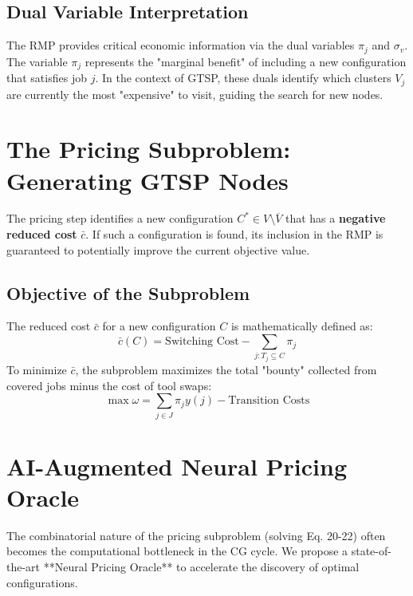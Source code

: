 \documentclass[12pt]{article}
\begin{document}
\subsection{Dual Variable Interpretation}
The RMP provides critical economic information via the dual variables $\pi_j$ and $\sigma_v$. The variable $\pi_j$ represents the "marginal benefit" of including a new configuration that satisfies job $j$. In the context of GTSP, these duals identify which clusters $V_j$ are currently the most "expensive" to visit, guiding the search for new nodes.

\section{The Pricing Subproblem: Generating GTSP Nodes}

The pricing step identifies a new configuration $C^* \in V \setminus \overline{V}$ that has a \textbf{negative reduced cost} $\bar{c}$. If such a configuration is found, its inclusion in the RMP is guaranteed to potentially improve the current objective value.

\subsection{Objective of the Subproblem}
The reduced cost $\bar{c}$ for a new configuration $C$ is mathematically defined as:
\begin{equation}
    \bar{c}(C) = \text{Switching Cost} - \sum_{j: T_j \subseteq C} \pi_j
\end{equation}
To minimize $\bar{c}$, the subproblem maximizes the total "bounty" collected from covered jobs minus the cost of tool swaps:
\begin{equation}
    \max \omega = \sum_{j \in J} \pi_j y(j) - \text{Transition Costs}
\end{equation}

\section{AI-Augmented Neural Pricing Oracle}

The combinatorial nature of the pricing subproblem (solving Eq. 20-22) often becomes the computational bottleneck in the CG cycle. We propose a state-of-the-art **Neural Pricing Oracle** to accelerate the discovery of optimal configurations.
\end{document}
